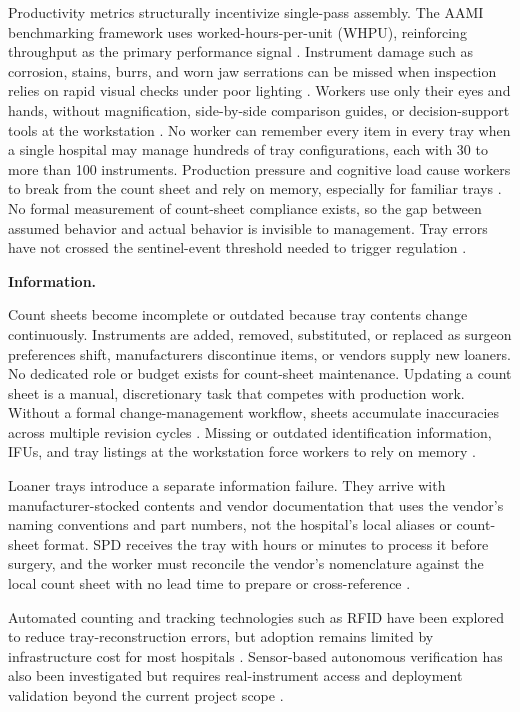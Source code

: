 \documentclass[10pt,a4paper]{article}
\begin{document}
Productivity metrics structurally incentivize single-pass assembly. The AAMI
benchmarking framework uses worked-hours-per-unit (WHPU), reinforcing throughput
as the primary performance signal
\cite{kusler-jensen-spd-benchmarking-2023}.
Instrument damage such as corrosion, stains, burrs, and worn jaw serrations can
be missed when inspection relies on rapid visual checks under poor lighting
\cite{lind-2026a}. Workers use only their eyes and hands, without magnification,
side-by-side comparison guides, or decision-support tools at the workstation
\cite{nichol-et-al-2024}. No worker can remember every item in every tray when a
single hospital may manage hundreds of tray configurations, each with 30 to more
than 100 instruments. Production pressure and cognitive load cause workers to
break from the count sheet and rely on memory, especially for familiar trays
\cite{nadeau-2024}. No formal measurement of count-sheet compliance exists, so
the gap between assumed behavior and actual behavior is invisible to management.
Tray errors have not crossed the sentinel-event threshold needed to trigger
regulation \cite{joint-commission-sentinel-event-2024}.

\textbf{Information.}

Count sheets become incomplete or outdated because tray contents change
continuously. Instruments are added, removed, substituted, or replaced as
surgeon preferences shift, manufacturers discontinue items, or vendors supply
new loaners. No dedicated role or budget exists for count-sheet maintenance.
Updating a count sheet is a manual, discretionary task that competes with
production work. Without a formal change-management workflow, sheets accumulate
inaccuracies across multiple revision cycles
\cite{nadeau-2024}. Missing or
outdated identification information, IFUs, and tray listings at the workstation
force workers to rely on memory \cite{lind-2025}.

Loaner trays introduce a separate information failure. They arrive with
manufacturer-stocked contents and vendor documentation that uses the vendor's
naming conventions and part numbers, not the hospital's local aliases or
count-sheet format. SPD receives the tray with hours or minutes to process it
before surgery, and the worker must reconcile the vendor's nomenclature against
the local count sheet with no lead time to prepare or cross-reference
\cite{steris-loaner-trays-2021}.

Automated counting and tracking technologies such as RFID have been explored to reduce tray-reconstruction errors, but adoption remains limited by infrastructure cost for most hospitals \cite{coustasse-et-al-2013, hill-et-al-2022, kusuda-et-al-2024, olivere-et-al-2021}. Sensor-based autonomous verification has also been investigated but requires real-instrument access and deployment validation beyond the current project scope \cite{da-silva-et-al-2026, sayani-et-al-2018}.
\end{document}

